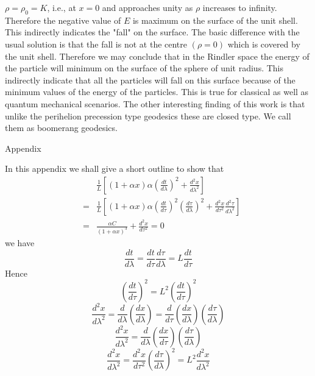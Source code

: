 \documentclass[12pt]{article}
\begin{document}
$\rho=\rho_0=K$, i.e., at $x=0$ and  approaches unity as $\rho$ increases to infinity. 
Therefore the negative value of $E$ is maximum on the surface of the unit shell. This 
indirectly indicates the "fall" on the surface. The basic difference with the usual solution is 
that the fall is not at the centre $(\rho=0)$ which is covered by the unit shell.
Therefore we may conclude that in the Rindler space the energy of the particle will minimum
on the surface of the sphere of unit radius. This indirectly indicate that all the particles
will fall on this surface because of the minimum values of the energy of the particles. This
is true for classical as well as quantum mechanical scenarios. The other interesting finding
of this work is that unlike the perihelion precession type geodesics these are closed type.
We call them as boomerang geodesics.
\begin{center}
Appendix
\end{center}
In this appendix we shall give a short outline to show that 
\begin{eqnarray}
&&\frac{1}{L}\left [(1+\alpha x)\alpha \left (\frac{dt}{d\lambda}\right )^2+\frac{d^2x}{d\lambda
^2}\right ]\nonumber \\
&=&\frac{1}{L}\left [(1+\alpha x)\alpha \left (\frac{dt}{d\tau}\right )^2
\left (\frac{d\tau}{d\lambda}\right )^2+\frac{d^2x}{d\tau^2}\frac{d^2\tau}{d\lambda
^2}\right ]
\nonumber \\
&=&\frac{\alpha C}{(1+\alpha x)^3}+\frac{d^2x}{d\tau ^2}=0
\end{eqnarray}
we have
\begin{equation}
\frac{dt}{d\lambda}=\frac{dt}{d\tau}\frac{d\tau}{d\lambda}=L\frac{dt}{d\tau}
\end{equation}
Hence
\begin{equation}
 \left (\frac{dt}{d\tau}\right )^2=L^2\left (\frac{dt}{d\tau}\right )^2
 \end{equation}
\begin{equation} 
\frac{d^2 x}{d\lambda ^2}=\frac{d}{d\lambda}\left (\frac{dx}{d\lambda}\right )
=\frac{d}{d\tau}\left (\frac{dx}{d\lambda}\right )\left (\frac{d\tau}{d\lambda}\right )
\end{equation}
\begin{equation} 
\frac{d^2 x}{d\lambda ^2}=\frac{d}{d\lambda}\left (\frac{dx}{d\tau}\right )
 \left (\frac{d\tau}{d\lambda}\right )
\end{equation}
\begin{equation} 
\frac{d^2 x}{d\lambda ^2}=\frac{d^2x}{d\tau ^2}\left (\frac{d\tau}{d\lambda}\right )^2
=L^2\frac{d^2x}{d\lambda ^2}
\end{equation}
\end{document}

